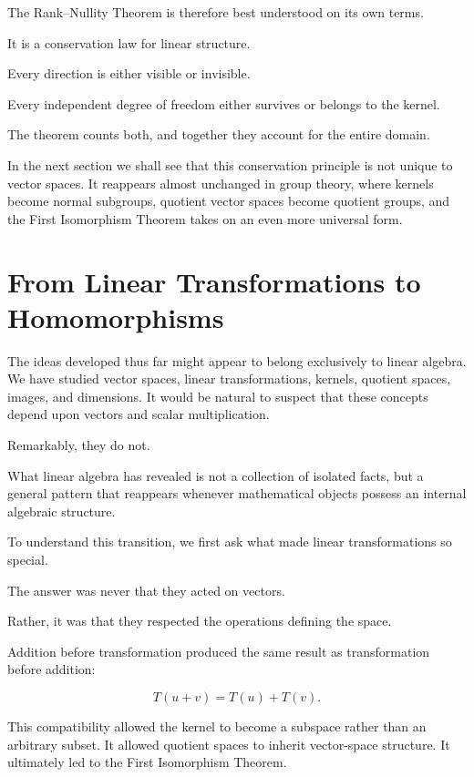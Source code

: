 \documentclass[11pt]{book}
\numberwithin{equation}{chapter}
\theoremstyle{definition}
\theoremstyle{plain}
\theoremstyle{remark}
\begin{document}
The Rank--Nullity Theorem is therefore best understood on its own terms.

It is a conservation law for linear structure.

Every direction is either visible or invisible.

Every independent degree of freedom either survives or belongs to the kernel.

The theorem counts both, and together they account for the entire domain.

In the next section we shall see that this conservation principle is not unique to vector spaces. It reappears almost unchanged in group theory, where kernels become normal subgroups, quotient vector spaces become quotient groups, and the First Isomorphism Theorem takes on an even more universal form.


\section{From Linear Transformations to Homomorphisms}

The ideas developed thus far might appear to belong exclusively to linear algebra. We have studied vector spaces, linear transformations, kernels, quotient spaces, images, and dimensions. It would be natural to suspect that these concepts depend upon vectors and scalar multiplication.

Remarkably, they do not.

What linear algebra has revealed is not a collection of isolated facts, but a general pattern that reappears whenever mathematical objects possess an internal algebraic structure.

To understand this transition, we first ask what made linear transformations so special.

The answer was never that they acted on vectors.

Rather, it was that they respected the operations defining the space.

Addition before transformation produced the same result as transformation before addition:

\[
T(u+v)=T(u)+T(v).
\]

This compatibility allowed the kernel to become a subspace rather than an arbitrary subset. It allowed quotient spaces to inherit vector-space structure. It ultimately led to the First Isomorphism Theorem.
\end{document}
